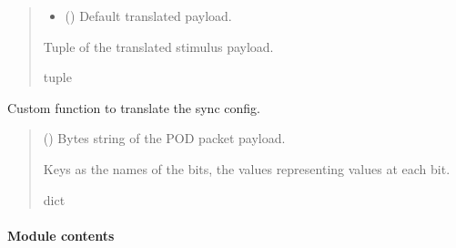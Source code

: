 \documentclass[letterpaper,10pt,english]{sphinxmanual}
\begin{document}
\begin{fulllineitems}
\begin{fulllineitems}
\begin{quote}
\begin{description}
\begin{itemize}
\item {} 
\sphinxAtStartPar
{} () \textendash{} Default translated payload.

\end{itemize}

\sphinxAtStartPar
Tuple of the translated stimulus payload.

\sphinxAtStartPar
tuple

\end{description}\end{quote}

\end{fulllineitems}


\begin{fulllineitems}
\label{\detokenize{PodApi.Devices:PodApi.Devices.PodDevice_8480SC.Pod8480SC._CustomSYNCCONFIG}}
\pysigstartsignatures
{}
\pysigstopsignatures
\sphinxAtStartPar
Custom function to translate the sync config.
\begin{quote}\begin{description}
\sphinxAtStartPar
{} () \textendash{} Bytes string of the POD packet payload.

\sphinxAtStartPar
Keys as the names of the bits, the values representing values at each bit.

\sphinxAtStartPar
dict

\end{description}\end{quote}

\end{fulllineitems}


\end{fulllineitems}



\paragraph{Module contents}
\label{\detokenize{PodApi.Devices:module-PodApi.Devices}}\label{\detokenize{PodApi.Devices:module-contents}}
\sphinxstepscope
\end{document}
